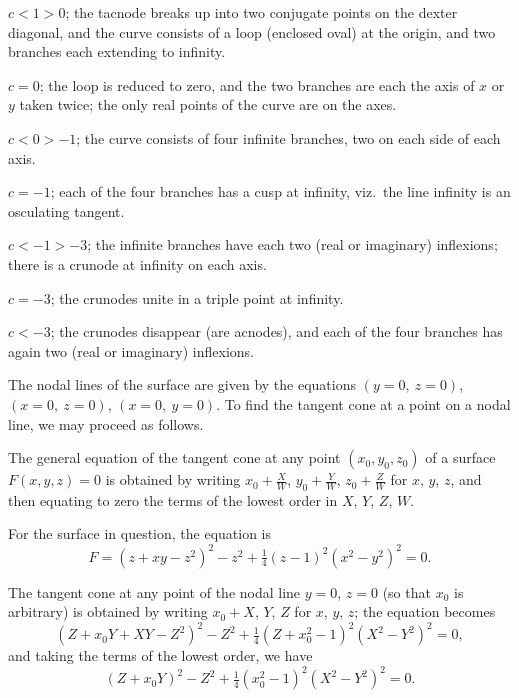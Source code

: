 \documentclass[12pt,a4paper]{article}
\theoremstyle{plain}
\theoremstyle{definition}
\begin{document}
\smallskip

$c < 1 > 0$; the tacnode breaks up into two conjugate points on the dexter diagonal, and the curve consists of a loop (enclosed oval) at the origin, and two branches each extending to infinity.

\smallskip

$c = 0$; the loop is reduced to zero, and the two branches are each the axis of $x$ or $y$ taken twice; the only real points of the curve are on the axes.

\smallskip

$c < 0 > -1$; the curve consists of four infinite branches, two on each side of each axis.

\smallskip

$c = -1$; each of the four branches has a cusp at infinity, viz.\ the line infinity is an osculating tangent.

\smallskip

$c < -1 > -3$; the infinite branches have each two (real or imaginary) inflexions; there is a crunode at infinity on each axis.

\smallskip

$c = -3$; the crunodes unite in a triple point at infinity.

\smallskip

$c < -3$; the crunodes disappear (are acnodes), and each of the four branches has again two (real or imaginary) inflexions.

\newpage
\setcounter{page}{9}

The nodal lines of the surface are given by the equations $(y = 0,\ z = 0)$, $(x = 0,\ z = 0)$, $(x = 0,\ y = 0)$. To find the tangent cone at a point on a nodal line, we may proceed as follows.

The general equation of the tangent cone at any point $(x_0, y_0, z_0)$ of a surface $F(x, y, z) = 0$ is obtained by writing $x_0 + \tfrac{X}{W}$, $y_0 + \tfrac{Y}{W}$, $z_0 + \tfrac{Z}{W}$ for $x$, $y$, $z$, and then equating to zero the terms of the lowest order in $X$, $Y$, $Z$, $W$.

For the surface in question, the equation is
\[
F = (z + xy - z^2)^2 - z^2 + \tfrac{1}{4}(z - 1)^2(x^2 - y^2)^2 = 0.
\]

The tangent cone at any point of the nodal line $y = 0$, $z = 0$ (so that $x_0$ is arbitrary) is obtained by writing $x_0 + X$, $Y$, $Z$ for $x$, $y$, $z$; the equation becomes
\[
(Z + x_0Y + XY - Z^2)^2 - Z^2 + \tfrac{1}{4}(Z + x_0^2 - 1)^2(X^2 - Y^2)^2 = 0,
\]
and taking the terms of the lowest order, we have
\[
(Z + x_0Y)^2 - Z^2 + \tfrac{1}{4}(x_0^2 - 1)^2(X^2 - Y^2)^2 = 0.
\]
\end{document}
